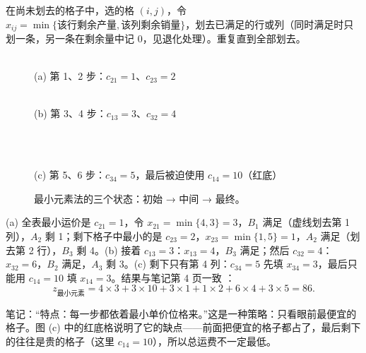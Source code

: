 \begin{definitionbox}
在尚未划去的格子中，选的格 $(i,j)$，令 $x_{ij}=\min\{\text{该行剩余产量},\text{该列剩余销量}\}$，划去已满足的行或列（同时满足时只划一条，另一条在剩余量中记 0，见退化处理）。重复直到全部划去。
\end{definitionbox}
\begin{figure}[H]
\centering
\begin{minipage}{0.48\linewidth}\centering
{}\\{\small (a) 第 1、2 步：$c_{21}=1$、$c_{23}=2$}
\end{minipage}\hfill
\begin{minipage}{0.48\linewidth}\centering
{}\\{\small (b) 第 3、4 步：$c_{13}=3$、$c_{32}=4$}
\end{minipage}\\[4pt]
\\{\small (c) 第 5、6 步：$c_{34}=5$，最后被迫使用 $c_{14}=10$（红底）}
\caption{最小元素法的三个状态：初始 → 中间 → 最终。}\label{fig:least}
\end{figure}
(a) 全表最小运价是 $c_{21}=1$，令 $x_{21}=\min\{4,3\}=3$，$B_1$ 满足（虚线划去第 1 列），$A_2$ 剩 1；剩下格子中最小的是 $c_{23}=2$，$x_{23}=\min\{1,5\}=1$，$A_2$ 满足（划去第 2 行），$B_3$ 剩 4。(b) 接着 $c_{13}=3$：$x_{13}=4$，$B_3$ 满足；然后 $c_{32}=4$：$x_{32}=6$，$B_2$ 满足，$A_3$ 剩 3。(c) 剩下只有第 4 列：$c_{34}=5$ 先填 $x_{34}=3$，最后只能用 $c_{14}=10$ 填 $x_{14}=3$。结果与笔记第 4 页一致 \orig：
\[
z_{\text{最小元素}}=4\times3+3\times10+3\times1+1\times2+6\times4+3\times5=86.
\]
\begin{intuitionbox}[“贪心”的代价]
笔记：“特点：每一步都依着最小单价位格来。”这是一种策略：只看眼前最便宜的格子。图 (c) 中的红底格说明了它的缺点——前面把便宜的格子都占了，最后剩下的往往是贵的格子（这里 $c_{14}=10$），所以总运费不一定最低。
\end{intuitionbox}
